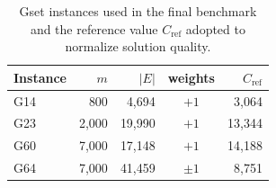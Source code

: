 \begin{table}[!h]
\centering
\caption{Gset instances used in the final benchmark and the reference value $C_{\mathrm{ref}}$ adopted to normalize solution quality.}
\label{tab:gset_instances}
\begin{tabular}{lrrcr}
\toprule
Instance & $m$ & $\lvert E\rvert$ & weights & $C_{\mathrm{ref}}$ \\
\midrule
G14 & 800 & 4,694 & $+1$ & 3,064 \\
G23 & 2,000 & 19,990 & $+1$ & 13,344 \\
G60 & 7,000 & 17,148 & $+1$ & 14,188 \\
G64 & 7,000 & 41,459 & $\pm1$ & 8,751 \\
\bottomrule
\end{tabular}
\end{table}
